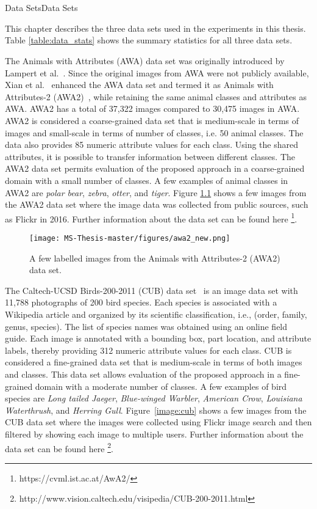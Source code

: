 \chapter{}{{Data Sets}}{Data Sets}

This chapter describes the three data sets used in the experiments in this thesis. Table \ref{table:data_stats} shows the summary statistics for all three data sets.

The Animals with Attributes (AWA) data set was originally introduced by Lampert et al.~\cite{DAP}. Since the original images from AWA were not publicly available, Xian et al.~\cite{gbu} enhanced the AWA data set and termed it as Animals with Attributes-2 (AWA2)~\cite{awa}, while retaining the same animal classes and attributes as AWA. AWA2 has a total of 37,322 images compared to 30,475 images in AWA. AWA2 is considered a coarse-grained data set that is medium-scale in terms of images and small-scale in terms of number of classes, i.e. 50 animal classes. The data also provides 85 numeric attribute values for each class. Using the shared attributes, it is possible to transfer information between different classes. The AWA2 data set permits evaluation of the proposed approach in a coarse-grained domain with a small number of classes. A few examples of animal classes in AWA2 are \textit{polar bear}, \textit{zebra}, \textit{otter}, and \textit{tiger}. Figure \ref{image:awa2} shows a few images from the AWA2 data set where the image data was collected from public sources, such as Flickr in 2016. Further information about the data set can be found here \footnote{https://cvml.ist.ac.at/AwA2/}.

\begin{figure}[ht]
\centering
\texttt{[image: MS-Thesis-master/figures/awa2\_new.png]}
\caption{A few labelled images from the Animals with Attributes-2 (AWA2) data set.}
\label{image:awa2}
\end{figure}


The Caltech-UCSD Birds-200-2011 (CUB) data set~\cite{cub} is an image data set with 11,788 photographs of 200 bird species. Each species is associated with a Wikipedia article and organized by its scientific classification, i.e., (order, family, genus, species). The list of species names was obtained using an online field guide. Each image is annotated with a bounding box, part location, and attribute labels, thereby providing 312 numeric attribute values for each class. CUB is considered a fine-grained data set that is medium-scale in terms of both images and classes. This data set allows evaluation of the proposed approach in a fine-grained domain with a moderate number of classes. A few examples of bird species are \textit{Long tailed Jaeger}, \textit{Blue-winged Warbler}, \textit{American Crow}, \textit{Louisiana Waterthrush}, and \textit{Herring Gull}. Figure~\ref{image:cub} shows a few images from the CUB data set where the images were collected using Flickr image search and then filtered by showing each image to multiple users. Further information about the data set can be found here \footnote{http://www.vision.caltech.edu/visipedia/CUB-200-2011.html}.


